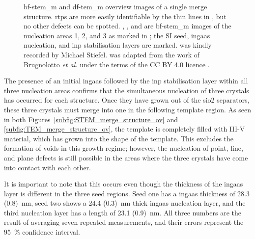 \begin{figure}
{
    }
    \caption[\acs{tem_m} and \acs{stem_m} images of the merge structures of sample 5.]{ \acs{bf}-\acs{stem_m} and  \acs{df}-\acs{tem_m} overview images of a single merge structure. \acs{rtp}s are more easily identifiable by the thin lines in , but no other defects can be spotted. , , and  are \acs{bf}-\acs{stem_m} images of the nucleation areas 1, 2, and 3 as marked in ; the \acs{SI} seed, \acs{ingaas} nucleation, and \acs{inp} stabilisation layers are marked.  was kindly recorded by Michael Stiefel.  was adapted from the work of Brugnolotto \textit{et al.} \cite{Brugnolotto2023_2} under the terms of the CC BY 4.0 licence \cite{CCBY40}.}
    \label{fig:merge_ov_seeds}
\end{figure}

The presence of an initial \acs{ingaas} followed by the \acs{inp} stabilisation layer within all three nucleation areas confirms that the simultaneous nucleation of three crystals has occurred for each structure. Once they have grown out of the \acs{sio2} separators, these three crystals must merge into one in the following template region. As seen in both Figures~\ref{subfig:STEM_merge_structure_ov} and \ref{subfig:TEM_merge_structure_ov}, the template is completely filled with III-V material, which has grown into the shape of the template. This excludes the formation of voids in this growth regime; however, the nucleation of point, line, and plane defects is still possible in the areas where the three crystals have come into contact with each other. 

It is important to note that this occurs even though the thickness of the \acs{ingaas} layer is different in the three seed regions. Seed one has a \acs{ingaas} thickness of \qty[separate-uncertainty=true]{28.3 (0.8)}{\nano\metre}, seed two shows a \qty[separate-uncertainty=true]{24.4 (0.3)}{\nano\metre} thick \acs{ingaas} nucleation layer, and the third nucleation layer has a length of \qty[separate-uncertainty=true]{23.1 (0.9)}{\nano\metre}. All three numbers are the result of averaging seven repeated measurements, and their errors represent the \qty{95}{\%} confidence interval. 

